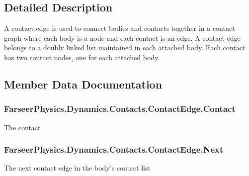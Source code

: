 \subsection{Detailed Description}
A contact edge is used to connect bodies and contacts together in a contact graph where each body is a node and each contact is an edge. A contact edge belongs to a doubly linked list maintained in each attached body. Each contact has two contact nodes, one for each attached body. 



\subsection{Member Data Documentation}
\hypertarget{class_farseer_physics_1_1_dynamics_1_1_contacts_1_1_contact_edge_a30c6cb2b2fa7ce6611b05b90d67763ba}{
\subsubsection[{Contact}]{ Farseer\+Physics.\+Dynamics.\+Contacts.\+Contact\+Edge.\+Contact}}\label{class_farseer_physics_1_1_dynamics_1_1_contacts_1_1_contact_edge_a30c6cb2b2fa7ce6611b05b90d67763ba}


The contact 

\hypertarget{class_farseer_physics_1_1_dynamics_1_1_contacts_1_1_contact_edge_a6d8d2781180055765af80b3f736b9ecc}{
\subsubsection[{Next}]{ Farseer\+Physics.\+Dynamics.\+Contacts.\+Contact\+Edge.\+Next}}\label{class_farseer_physics_1_1_dynamics_1_1_contacts_1_1_contact_edge_a6d8d2781180055765af80b3f736b9ecc}


The next contact edge in the body's contact list 

